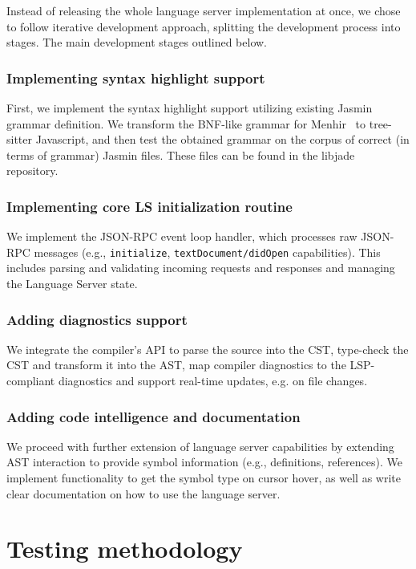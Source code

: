 Instead of releasing the whole language server implementation at once, we chose
to follow iterative development approach, splitting the development process into 
stages. The main development stages outlined below.

\subsubsection*{Implementing syntax highlight support}
First, we implement the syntax highlight support utilizing existing Jasmin
grammar definition. We transform the BNF-like grammar for Menhir~\cite{menhir}
to tree-sitter Javascript, and then test the obtained grammar on the corpus of
correct (in terms of grammar) Jasmin files. These files can be found in the 
libjade~\cite{gh-libjade} repository.

\subsubsection*{Implementing core LS initialization routine}
We implement the JSON-RPC event loop handler, which processes raw
JSON-RPC messages (e.g., \texttt{initialize}, \texttt{textDocument/didOpen}
capabilities).  This includes parsing and validating incoming requests and
responses and managing the Language Server state.

\subsubsection*{Adding diagnostics support}
We integrate the compiler's API to parse the source into the CST, type-check
the CST and transform it into the AST, map compiler diagnostics to the
LSP-compliant diagnostics and support real-time updates, e.g. on file
changes.

\subsubsection*{Adding code intelligence and documentation}
We proceed with further extension of language server capabilities by extending
AST interaction to provide symbol information (e.g., definitions, references).
We implement functionality to get the symbol type on cursor hover, as well as 
write clear documentation on how to use the language server.

\section{Testing methodology}


